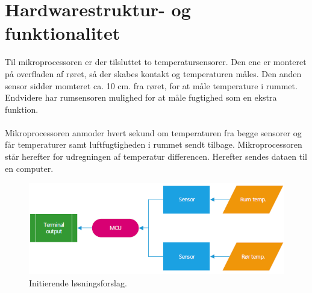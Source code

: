\section{Hardwarestruktur- og funktionalitet}
Til mikroprocessoren er der tilsluttet to  temperatursensorer. Den ene er monteret på overfladen af røret, så der skabes kontakt og temperaturen måles. Den anden sensor sidder momteret ca. 10 cm. fra røret, for at måle temperature i rummet. Endvidere har rumsensoren mulighed for at måle fugtighed som en ekstra funktion.
\\
\\
Mikroprocessoren anmoder hvert sekund om temperaturen fra begge sensorer og får temperaturer samt luftfugtigheden i rummet sendt tilbage. 
Mikroprocessoren står herefter for udregningen af temperatur differencen. Herefter
sendes dataen til en computer.\newline

\begin{figure}[h!]
  \centering
  \includegraphics[width=1\textwidth]{figures/hardwarestruktur.png}
  \caption{Initierende løsningsforslag.}
\end{figure}








